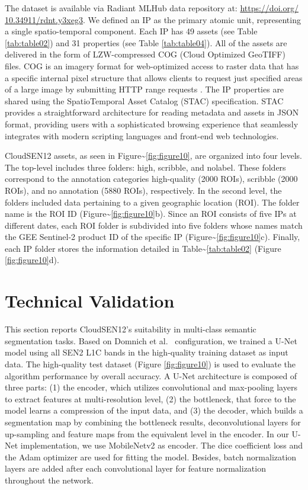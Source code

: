 \documentclass[a4paper, nobind]{templates/cdethesis}
\begin{document}
The dataset is available via Radiant MLHub\cite{dsds} data repository at: \href{https://doi.org/10.34911/rdnt.y3xeg3}{https://doi.org/ 10.34911/rdnt.y3xeg3}. We defined an IP as the primary atomic unit, representing a single spatio-temporal component. Each IP has 49 assets (see Table \ref{tab:table02}) and 31 properties (see Table \ref{tab:table04}). All of the assets are delivered in the form of LZW-compressed COG (Cloud Optimized GeoTIFF) files. COG is an imagery format for web-optimized access to raster data that has a specific internal pixel structure that allows clients to request just specified areas of a large image by submitting HTTP range requests \cite{IosifescuEnescu2021}. The IP properties are shared using the SpatioTemporal Asset Catalog (STAC) specification. STAC provides a straightforward architecture for reading metadata and assets in JSON format, providing users with a sophisticated browsing experience that seamlessly integrates with modern scripting languages and front-end web technologies.

CloudSEN12 assets, as seen in Figure\textasciitilde{}\ref{fig:figure10}, are organized into four levels. The top-level includes three folders: high, scribble, and nolabel. These folders correspond to the annotation categories high-quality (2000 ROIs), scribble (2000 ROIs), and no annotation (5880 ROIs), respectively. In the second level, the folders included data pertaining to a given geographic location (ROI). The folder name is the ROI ID (Figure\textasciitilde{}\ref{fig:figure10}b). Since an ROI consists of five IPs at different dates, each ROI folder is subdivided into five folders whose names match the GEE Sentinel-2 product ID of the specific IP (Figure\textasciitilde{}\ref{fig:figure10}c). Finally, each IP folder stores the information detailed in Table\textasciitilde{}\ref{tab:table02} (Figure \ref{fig:figure10}d).

\hypertarget{technical-validation}{%
\section{Technical Validation}\label{technical-validation}}

This section reports CloudSEN12's suitability in multi-class semantic segmentation tasks. Based on Domnich et al.~\cite{Domnich2021} configuration, we trained a U-Net \cite{unet} model using all SEN2 L1C bands in the high-quality training dataset as input data. The high-quality test dataset (Figure \ref{fig:figure10}) is used to evaluate the algorithm performance by overall accuracy. A U-Net architecture is composed of three parts: (1) the encoder, which utilizes convolutional and max-pooling layers to extract features at multi-resolution level, (2) the bottleneck, that force to the model learns a compression of the input data, and (3) the decoder, which builds a segmentation map by combining the bottleneck results, deconvolutional layers for up-sampling and feature maps from the equivalent level in the encoder. In our U-Net implementation, we use MobileNetv2 \cite{Sandler2018} as encoder. The dice coefficient loss and the Adam optimizer are used for fitting the model. Besides, batch normalization layers are added after each convolutional layer for feature normalization throughout the network.
\end{document}
